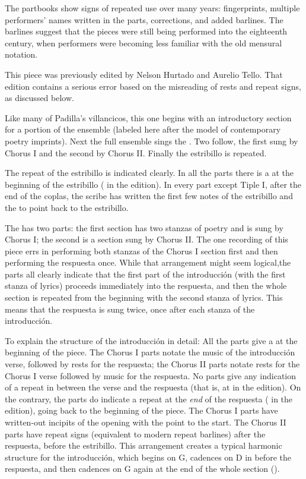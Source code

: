 The partbooks show signs of repeated use over many years: fingerprints, multiple performers' names written in the parts, corrections, and added barlines.
The barlines suggest that the pieces were still being performed into the eighteenth century, when performers were becoming less familiar with the old mensural notation.

This piece was previously edited by Nelson Hurtado and Aurelio Tello.
That edition contains a serious error based on the misreading of rests and repeat signs, as discussed below. %


Like many of Padilla's villancicos, this one begins with an introductory section for a portion of the ensemble (labeled here  after the model of contemporary poetry imprints).
Next the full ensemble sings the .
Two  follow, the first sung by Chorus I and the second by Chorus II. 
Finally the estribillo is repeated.

The repeat of the estribillo is indicated clearly.
In all the parts there is a  at the beginning of the estribillo ( in the edition).
In every part except Tiple I, after the end of the coplas, the scribe has written the first few notes of the estribillo and the  to point back to the estribillo.

The  has two parts: the first section has two stanzas of poetry and is sung by Chorus I; the second is a  section sung by Chorus II.
The one recording of this piece errs in performing both stanzas of the Chorus I section first and then performing the respuesta once.\autocite{Padilla:HabanaCD}
While that arrangement might seem logical,the parts all clearly indicate that the first part of the introducción (with the first stanza of lyrics) proceeds immediately into the respuesta, and then the whole section is repeated from the beginning with the second stanza of lyrics.
This means that the respuesta is sung twice, once after each stanza of the introducción.

To explain the structure of the introducción in detail:
All the parts give a  at the beginning of the piece.
The Chorus I parts notate the music of the introducción verse, followed by rests for the respuesta; the Chorus II parts notate rests for the Chorus I verse followed by music for the respuesta.
No parts give any indication of a repeat in between the verse and the respuesta (that is, at  in the edition).
On the contrary, the parts do indicate a repeat at the \emph{end} of the respuesta ( in the edition), going back to the beginning of the piece.
The Chorus I parts have written-out incipits of the opening with the  point to the start.
The Chorus II parts have repeat signs (equivalent to modern repeat barlines) after the respuesta, before the estribillo.
This arrangement creates a typical harmonic structure for the introducción, which begins on G, cadences on D in  before the respuesta, and then cadences on G again at the end of the whole section (). 

